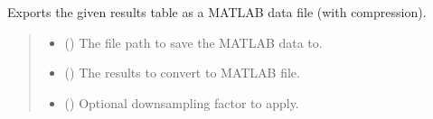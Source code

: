 \documentclass[letterpaper,10pt,english]{sphinxmanual}
\begin{document}
\begin{fulllineitems}
\label{\detokenize{modules/output/formats:qnav.output.formats.save_as_matlab_comp}}
\pysigstartsignatures
{}
\pysigstopsignatures
\sphinxAtStartPar
Exports the given results table as a MATLAB data file (with compression).
\begin{quote}\begin{description}
\begin{itemize}
\item {} 
\sphinxAtStartPar
{} () \textendash{} The file path to save the MATLAB data to.

\item {} 
\sphinxAtStartPar
{} ({\hyperref[\detokenize{modules/output/data:qnav.output.data.ResultsTable}]{}}) \textendash{} The results to convert to MATLAB file.

\item {} 
\sphinxAtStartPar
{} () \textendash{} Optional down\sphinxhyphen{}sampling factor to apply.

\end{itemize}

\end{description}\end{quote}

\end{fulllineitems}

\end{document}
